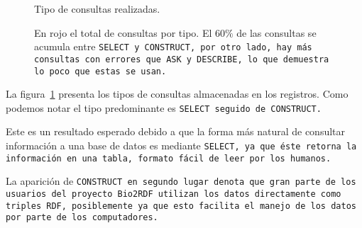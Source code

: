 \begin{figure}[ht]
  \caption{Tipo de consultas realizadas.}\label{fig:qtype}
  \vspace{-.2cm}
  \caption*{\small
    En rojo el total de consultas por tipo. El $60\%$ de las consultas se
    acumula entre \tt{SELECT} y \tt{CONSTRUCT}, por otro lado, hay más consultas
    con errores que \tt{ASK} y \tt{DESCRIBE}, lo que demuestra lo poco que estas
    se usan.
  }
\end{figure}

La figura~\ref{fig:qtype} presenta los tipos de consultas almacenadas en los
registros.
Como podemos notar el tipo predominante es \tt{SELECT} seguido de 
\tt{CONSTRUCT}.

Este es un resultado esperado debido a que la forma más natural
de consultar información a una base de datos es mediante \tt{SELECT}, ya que 
éste retorna la información en una tabla, formato fácil de leer por los humanos.

La aparición de \tt{CONSTRUCT} en segundo lugar denota que gran parte de los
usuarios del proyecto Bio2RDF utilizan los datos directamente como  triples RDF,
posiblemente ya que esto facilita el manejo de los datos por parte de los
computadores.

